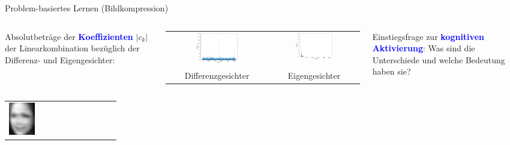 \documentclass[10pt,aspectratio=169]{beamer}
\begin{document}
\begin{frame}[fragile]{Problem-basiertes Lernen (Bildkompression)}
	\begin{minipage}{0.65\textwidth}
		\begin{columns}[T,onlytextwidth]
			\column{\textwidth}
			Absolutbeträge der \textcolor{blue}{\textbf{Koeffizienten}} $\lvert c_k\rvert$ der Linearkombination bezüglich der Differenz- und Eigengesichter:
			\begin{tabular}{cc}
				\centering
				\includegraphics[width=0.45\textwidth]{images/eigenfaces/naive_coef} &
				\includegraphics[width=0.45\textwidth]{images/eigenfaces/eigen_coef} \\
				\phantom{text}Differenzgesichter & \phantom{text}Eigengesichter
			\end{tabular}
			\begin{block}{Einstiegsfrage zur \textcolor{blue}{\textbf{kognitiven Aktivierung}}:}
				Was sind die Unterschiede und welche Bedeutung haben sie?
			\end{block}
		\end{columns}
	\end{minipage}\hfill
	\pause
	\begin{minipage}{0.3\textwidth}
		\begin{tabular}{m{1.0cm} m{1.0cm} c}
			\includegraphics[width=0.3\textwidth]{images/compression/mona_lisa_20} &

\end{tabular}
\end{minipage}
\end{frame}
\end{document}
